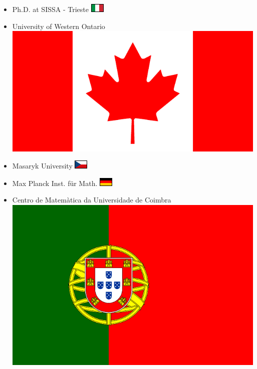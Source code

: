 \documentclass{beamer}
\author{Fosco Loregian \darkLogo}
\title{}
\date{\today}
\begin{document}
\begin{frame}
  \maketitle
\end{frame}
\begin{frame}
  \begin{itemize}
    \item<+-> Ph.D. at SISSA - Trieste \includegraphics{ita.pdf}

    \item<+-> University of Western Ontario \includegraphics[scale=.04]{can.pdf}

    \item<+-> Masaryk University \includegraphics{czr.pdf}

    \item<+-> Max Planck Inst. für Math. \includegraphics{ger.pdf}

    \item<+-> Centro de Matemàtica da Universidade de Coimbra \includegraphics[scale=.04]{por.pdf}


\end{itemize}
\end{frame}
\end{document}
